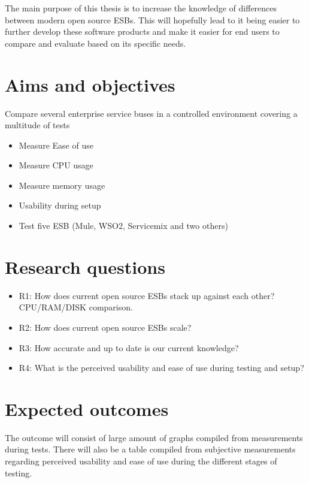 \documentclass[10pt,a4paper]{proposal}
\begin{document}
The main purpose of this thesis is to increase the knowledge of differences between modern open source ESBs. This will hopefully lead to it being easier to further develop these software products and make it easier for end users to compare and evaluate based on its specific needs.


\section*{Aims and objectives}
Compare several enterprise service buses in a controlled environment covering a multitude of tests 

\begin{itemize}
	\item Measure Ease of use
	\item Measure CPU usage
	\item Measure memory usage
	\item Usability during setup
	\item  Test five ESB (Mule, WSO2, Servicemix and two others)
\end{itemize}


\section*{Research questions}
\begin{itemize}
	\item R1: How does current open source ESBs stack up against each other? CPU/RAM/DISK comparison.
	\item R2: How does current open source ESBs scale?
	\item R3: How accurate and up to date is our current knowledge? 
	\item R4: What is the perceived usability and ease of use during testing and setup?
\end{itemize}


\section*{Expected outcomes}
The outcome will consist of large amount of graphs compiled from measurements during tests. There will also be a table compiled from subjective measurements regarding perceived usability and ease of use during the different stages of testing.
\end{document}
